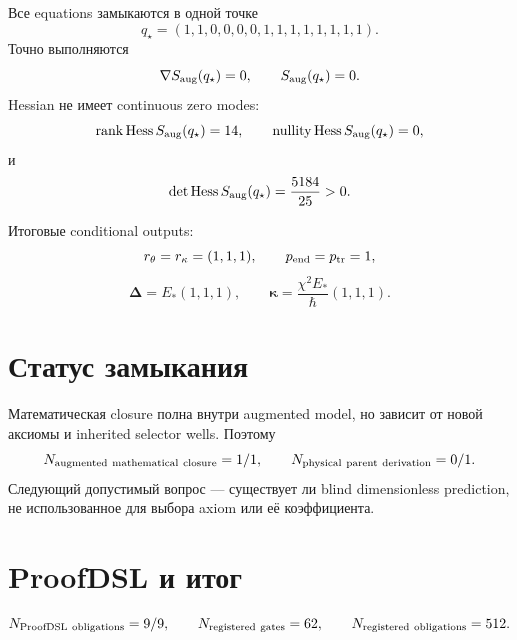 Все equations замыкаются в одной точке
\begin{equation}
 q_\star=(1,1,0,0,0,0,1,1,1,1,1,1,1,1).
 \label{eq:v9-kms-augmented-point}
\end{equation}
Точно выполняются
\begin{equation}
 \nabla S_{\rm aug}(q_\star)=0,
 \qquad S_{\rm aug}(q_\star)=0.
 \label{eq:v9-kms-augmented-stationarity}
\end{equation}
Hessian не имеет continuous zero modes:
\begin{equation}
 \operatorname{rank}\operatorname{Hess} S_{\rm aug}(q_\star)=14,
 \qquad \operatorname{nullity}\operatorname{Hess} S_{\rm aug}(q_\star)=0,
 \label{eq:v9-kms-augmented-rank}
\end{equation}
и
\begin{equation}
 \det\operatorname{Hess} S_{\rm aug}(q_\star)=\frac{5184}{25}>0.
 \label{eq:v9-kms-augmented-determinant}
\end{equation}

Итоговые conditional outputs:
\begin{equation}
 r_\theta=r_\kappa=(1,1,1),
 \qquad p_{\rm end}=p_{\rm tr}=1,
 \label{eq:v9-kms-augmented-shape-output}
\end{equation}
\begin{equation}
 \boldsymbol\Delta=E_*(1,1,1),
 \qquad
 \boldsymbol\kappa=\frac{\chi^2E_*}{\hbar}(1,1,1).
 \label{eq:v9-kms-augmented-physical-output}
\end{equation}

\section{Статус замыкания}

Математическая closure полна внутри augmented model, но зависит от новой
аксиомы и inherited selector wells. Поэтому
\begin{equation}
 N_{\rm augmented\ mathematical\ closure}=1/1,
 \qquad N_{\rm physical\ parent\ derivation}=0/1.
 \label{eq:v9-kms-augmented-status}
\end{equation}
Следующий допустимый вопрос --- существует ли blind dimensionless
prediction, не использованное для выбора axiom или её коэффициента.

\section{ProofDSL и итог}

\begin{equation}
 N_{\rm ProofDSL\ obligations}=9/9,
 \qquad N_{\rm registered\ gates}=62,
 \qquad N_{\rm registered\ obligations}=512.
 \label{eq:v9-kms-augmented-proofdsl}
\end{equation}

